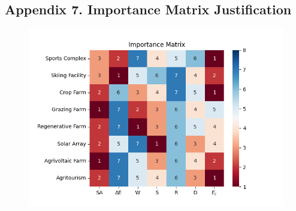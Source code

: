 \documentclass{mcmthesis}
\begin{document}
\newpage
\subsection{Appendix 7. Importance Matrix Justification}
\begin{figure}[!htbp]
\centering
    \includegraphics[scale=0.6]{figures/correlationmatrix.png}
\end{figure}
\end{document}
